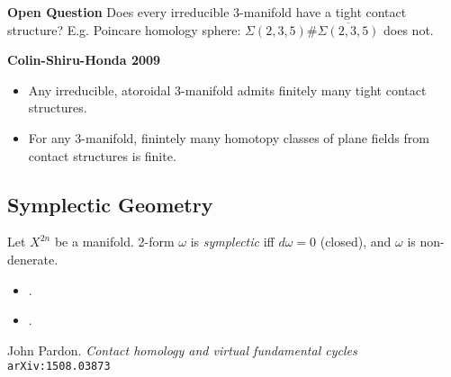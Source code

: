 \documentclass[12pt]{article}
\begin{document}
{\noindent \textbf{Open Question} Does every irreducible 3-manifold have a tight contact structure? E.g. Poincare homology sphere: $\Sigma (2,3,5) \# \overline{\Sigma (2,3,5)}$ does not.  \newline

\noindent \textbf{Colin-Shiru-Honda 2009} 
\begin{itemize}
	\item Any irreducible, atoroidal 3-manifold admits finitely many tight contact structures.
	\item For any 3-manifold, finintely many homotopy classes of plane fields from contact structures is finite.
\end{itemize}

\subsection{Symplectic Geometry}

Let $X^{2n}$ be a manifold.  2-form $\omega$ is \textit{symplectic} iff $d\omega = 0$ (closed), and $\omega$ is non-denerate.
\begin{itemize}
	\item .
	\item .
\end{itemize}

\begin{thebibliography}{9}


John Pardon. \textit{Contact homology and virtual fundamental cycles}  \texttt{arXiv:1508.03873}


\end{thebibliography}}
\end{document}
